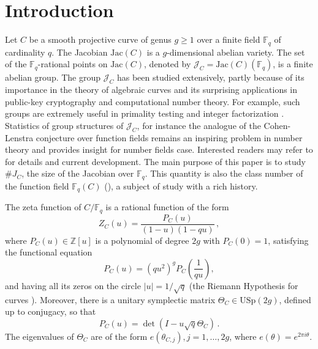 \documentclass[12pt]{amsart}
\theoremstyle{plain}
\newcommand{\Z}{{\mathbb Z}}
\newcommand{\F}{{\mathbb F}_q}
\newcommand{\jac}{\mathrm{Jac}}
\newcommand{\J}{\mathcal J}
\begin{document}
\maketitle

\section{Introduction}
Let $C$ be a smooth projective curve of genus $g \ge 1$ over a finite field $\F$ of cardinality $q$. The Jacobian $\jac(C)$ is a $g$-dimensional abelian variety. The set of the $\F$-rational points on $\jac(C)$, denoted by $\J_C=\jac(C)(\F)$, is a finite abelian group. The group $\J_C$ has been studied extensively, partly because of its importance in the theory of algebraic curves and its surprising applications in public-key cryptography and computational number theory. For example, such groups are extremely useful in primality testing \cite{adl} and integer factorization \cite{len1,len2}. Statistics of group structures of $\J_C$, for instance the analogue of the Cohen-Lenstra conjecture over function fields remains an inspiring problem in number theory and provides insight for number fields case. Interested readers may refer to \cite{ach1,ach2,ven} for details and current development. The main purpose of this paper is to study $\#J_C$, the size of the Jacobian over $\F$. This quantity is also the class number of the function field $\F(C)$ (\cite[Theorem 5.9]{ros}), a subject of study with a rich history.


The zeta function of $C/\F$ is a rational function of the form
\[ Z_{C}(u) = \frac{P_{C}(u)}{
(1-u)(1-qu)}\,, \]
where $P_{C}(u) \in \Z[u]$ is a polynomial of degree $2g$ with $P_{C}(0)=1$, satisfying the functional equation
\[P_{C}(u)=\left(qu^2\right)^g P_{C}\left(\frac{1}{qu}\right), \]
and having all its zeros on the circle $|u| = 1/\sqrt{q}$ (the Riemann Hypothesis for curves \cite{wei}). Moreover, there is a unitary symplectic matrix $\Theta_C \in \mathrm{USp}(2g)$, defined up to conjugacy, so that
\[P_C(u) =\det \left(I-u \sqrt{q} \Theta_C\right)\,.\]
The eigenvalues of $\Theta_C$ are of the form $e\left(\theta_{C,j}\right), j=1, \ldots, 2g$, where $e(\theta)=e^{2 \pi i \theta}$.
\end{document}
